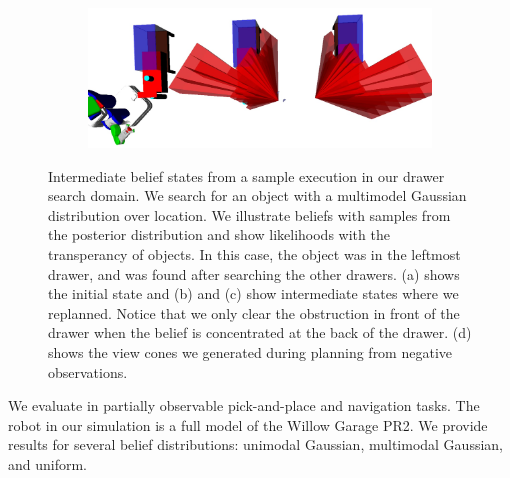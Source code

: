 \begin{figure}
\begin{subfigure}[b]{0.48\linewidth}
    \caption{}
    \label{fig:step4}
  \end{subfigure}
  \begin{subfigure}[b]{0.48\linewidth}
    \includegraphics[width=\textwidth]{drawer_images/drawer_dist_negreg.png}
    \caption{}
    \label{fig:step5}
  \end{subfigure}
  \caption{Intermediate belief states from a sample execution in our
    drawer search domain. We search for an object with a multimodel
    Gaussian distribution over location. We illustrate beliefs with
    samples from the posterior distribution and show likelihoods with
    the transperancy of objects. In this case, the object was in the
    leftmost drawer, and was found after searching the other
    drawers. (a) shows the initial state and (b) and (c) show
    intermediate states where we replanned. Notice that we only clear
    the obstruction in front of the drawer when the belief is
    concentrated at the back of the drawer. (d) shows the view cones
    we generated during planning from negative observations.}
  \label{fig:drawerimgs}
\end{figure}


We evaluate \ibsp{} in partially observable pick-and-place and navigation tasks.
The robot in our simulation is a full model of the Willow Garage PR2. We
provide results for several belief distributions: unimodal Gaussian, multimodal
Gaussian, and uniform.
